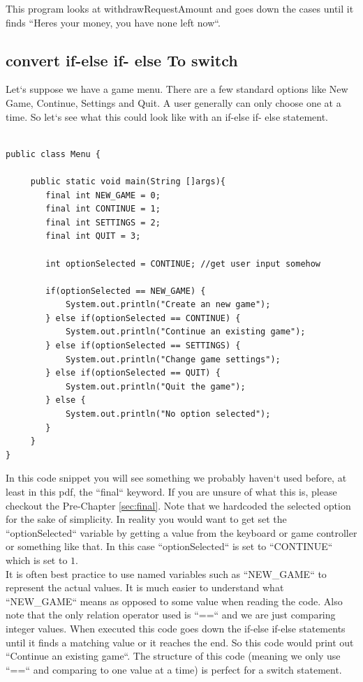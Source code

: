 \documentclass[11]{article}
\begin{document}
This program looks at withdrawRequestAmount and goes down the cases until it finds ``Heres your money, you have none left now``. 

\subsection{convert if-else if- else To switch}
Let`s suppose we have a game menu. There are a few standard options like New Game, Continue, Settings and Quit. A user generally can only choose one at a time. So let`s see what this could look like with an if-else if- else statement.

\begin{lstlisting}

public class Menu {

     public static void main(String []args){
        final int NEW_GAME = 0;
        final int CONTINUE = 1;
        final int SETTINGS = 2;
        final int QUIT = 3;
        
        int optionSelected = CONTINUE; //get user input somehow
        
        if(optionSelected == NEW_GAME) {
            System.out.println("Create an new game");
        } else if(optionSelected == CONTINUE) {
            System.out.println("Continue an existing game");
        } else if(optionSelected == SETTINGS) {
            System.out.println("Change game settings");
        } else if(optionSelected == QUIT) {
            System.out.println("Quit the game");
        } else {
            System.out.println("No option selected");
        }
     }
}
\end{lstlisting}
In this code snippet you will see something we probably haven`t used before, at least in this pdf, the ``final`` keyword. If you are unsure of what this is, please checkout the Pre-Chapter \autoref{sec:final}. Note that we hardcoded the selected option for the sake of simplicity. In reality you would want to get set the  ``optionSelected`` variable by getting a value from the keyboard or game controller or something like that. In this case ``optionSelected`` is set to ``CONTINUE`` which is set to $1$. \\ 

It is often best practice to use named variables such as ``NEW{\_}GAME`` to represent the actual values. It is much easier to understand what ``NEW{\_}GAME`` means as opposed to some value when reading the code. Also note that the only relation operator used is ``==`` and we are just comparing integer values. When executed this code goes down the if-else if-else statements until it finds a matching value or it reaches the end. So this code would print out ``Continue an existing game``.  The structure of this code (meaning we only use ``==`` and comparing to one value at a time) is perfect for a switch statement.\\
\end{document}
